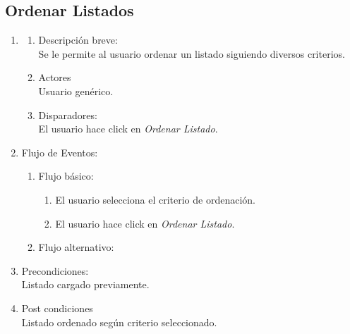 \documentclass[a4paper,11pt]{article}
\begin{document}
\subsection{Ordenar Listados}
\begin{enumerate}

    \item
    \begin{enumerate}
    \item Descripción breve: \\
        Se le permite al usuario ordenar un listado siguiendo diversos criterios.
    \item Actores \\
        Usuario genérico.
    \item Disparadores: \\
        El usuario hace click en \emph{Ordenar Listado}.
    \end{enumerate}

    \item Flujo de Eventos: 

    \begin{enumerate}

        \item Flujo básico:
        \begin{enumerate}
                    \item El usuario selecciona el criterio de ordenación.
                    \item El usuario hace click en \emph{Ordenar Listado}.
        \end{enumerate}
        \item Flujo alternativo:\\

    \end{enumerate}

    \item Precondiciones: \\
        Listado cargado previamente.

    \item Post condiciones \\
        Listado ordenado según criterio seleccionado.

\end{enumerate}

\end{document}
